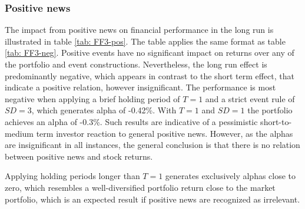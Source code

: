 \subsubsection{Positive news}

The impact from positive news on financial performance in the long run is illustrated in table \ref{tab: FF3-pos}. The table applies the same format as table \ref{tab: FF3-neg}. Positive events have no significant impact on returns over any of the portfolio and event constructions. Nevertheless, the long run effect is predominantly negative, which appears in contrast to the short term effect, that indicate a positive relation, however insignificant. The performance is most negative when applying a brief holding period of $T=1$ and a strict event rule of $SD = 3$, which generates alpha of -0.42\%. With $T=1$ and $SD=1$ the portfolio achieves an alpha of -0.3\%.  
Such results are indicative of a pessimistic short-to-medium term investor reaction to general positive news. However, as the alphas are insignificant in all instances, the general conclusion is that there is no relation between positive news and stock returns. 

Applying holding periods longer than $T=1$ generates exclusively alphas close to zero, which resembles a well-diversified portfolio return close to the market portfolio, which is an expected result if positive news are recognized as irrelevant. 



